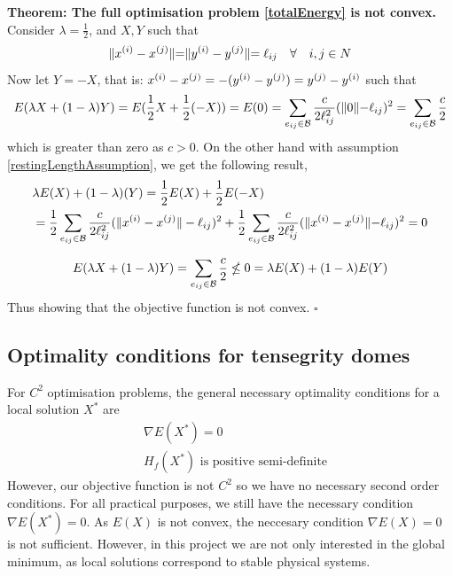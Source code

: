 \textbf{Theorem: The full optimisation problem \eqref{totalEnergy} is not convex.}\\
Consider $\lambda = \frac{1}{2}$, and $X,Y$ such that 
\begin{equation}
\label{restingLengthAssumption}
    \rVert x^{(i)}-x^{(j)} \lVert = \rVert y^{(i)}-y^{(j)} \lVert = \ell_{ij} \quad \forall \quad i,j \in N
\end{equation}
Now let $Y = -X$, that is: $x^{(i)}-x^{(j)} = -(y^{(i)}-y^{(j)}) = y^{(j)}-y^{(i)}$ such that
\begin{equation}
\label{energyConv1}
    E(\lambda X + (1-\lambda) Y) = E(\frac{1}{2}X + \frac{1}{2}(-X)) 
    = E(0) = \sum\limits_{e_{ij} \in \mathcal{B}} \frac{c}{2 \ell_{ij}^2} ( \rVert 0 \lVert - \ell_{ij})^2 = \sum\limits_{e_{ij} \in \mathcal{B}}\frac{c}{2}     
\end{equation}
which is greater than zero as $c>0$.
On the other hand with assumption \eqref{restingLengthAssumption}, we get the following result,
\begin{equation}
\label{energyConv2}
\begin{aligned}    
    &\lambda E(X) + (1-\lambda)(Y) = \frac{1}{2}E(X) + \frac{1}{2}E(-X) \\&
    = \frac{1}{2}\sum\limits_{e_{ij} \in \mathcal{B}} \frac{c}{2\ell_{ij}^2} (\lVert x^{(i)} - x^{(j)}\rVert - \ell_{ij})^2 + \frac{1}{2} \sum\limits_{e_{ij} \in \mathcal{B}}\frac{c}{2\ell_{ij}^2} (\rVert x^{(i)}-x^{(j)}\lVert-\ell_{ij})^2 = 0
    \end{aligned}
\end{equation}

\begin{equation*}
     E(\lambda X + (1-\lambda) Y) = \sum\limits_{e_{ij} \in \mathcal{B}}\frac{c}{2}  \nleq 0  = \lambda E(X) + (1-\lambda)E(Y)
\end{equation*}
Thus showing that the objective function is not convex. \hfill $\square$
\subsection{Optimality conditions for tensegrity domes}
For $C^2$ optimisation problems, the general necessary optimality conditions for a local solution $X^*$ are
\begin{align*}
    &\nabla E(X^*) = 0\\
    & H_f(X^*) \text{ is positive semi-definite}
\end{align*}
However, our objective function is not $C^2$ so we have no necessary second order conditions. For all practical purposes, we still have the necessary condition $\nabla E(X^*) = 0$. As $E(X)$ is not convex, the neccesary condition $\nabla E(X)=0$ is not sufficient. However, in this project we are not only interested in the global minimum, as local solutions correspond to stable physical systems. 
